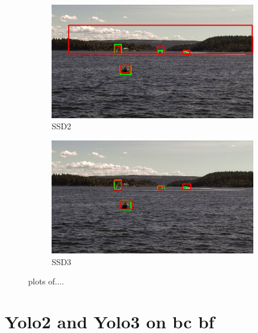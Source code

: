 \begin{figure}
\begin{subfigure}{.5\textwidth}
  \centering
  \includegraphics[width=0.9\linewidth]{results/case_buildings/bigbox_bcbf/SSD2/selected_08_14_frame1150.jpg}
  \caption{SSD2}
  \label{fig:sfig1}
\end{subfigure}%
\begin{subfigure}{.5\textwidth}
  \centering
  \includegraphics[width=.9\linewidth]{results/case_buildings/bigbox_bcbf/SSD3/selected_08_14_frame1150.jpg}
  \caption{SSD3}
  \label{fig:sfig2}
\end{subfigure}

\caption{plots of....}
\label{fig:fig}
\end{figure}

\newpage

\section{Yolo2 and Yolo3 on bc bf}
\label{sec:yolo23_bcbf}

